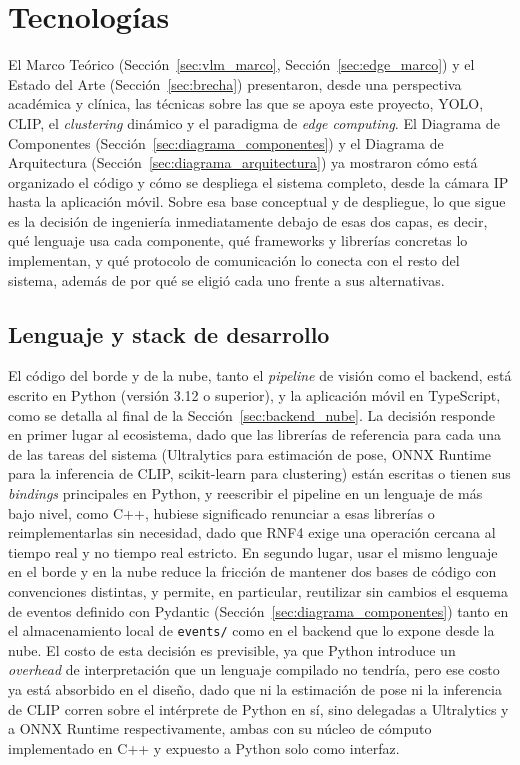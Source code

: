 \section{Tecnologías}
\label{sec:tecnologias}

El Marco Teórico (Sección~\ref{sec:vlm_marco}, Sección~\ref{sec:edge_marco}) y el Estado del Arte (Sección~\ref{sec:brecha}) presentaron, desde una perspectiva académica y clínica, las técnicas sobre las que se apoya este proyecto, YOLO, CLIP, el \textit{clustering} dinámico y el paradigma de \textit{edge computing}.
El Diagrama de Componentes (Sección~\ref{sec:diagrama_componentes}) y el Diagrama de Arquitectura (Sección~\ref{sec:diagrama_arquitectura}) ya mostraron cómo está organizado el código y cómo se despliega el sistema completo, desde la cámara IP hasta la aplicación móvil.
Sobre esa base conceptual y de despliegue, lo que sigue es la decisión de ingeniería inmediatamente debajo de esas dos capas, es decir, qué lenguaje usa cada componente, qué frameworks y librerías concretas lo implementan, y qué protocolo de comunicación lo conecta con el resto del sistema, además de por qué se eligió cada uno frente a sus alternativas.

\subsection{Lenguaje y stack de desarrollo}

El código del borde y de la nube, tanto el \textit{pipeline} de visión como el backend, está escrito en Python (versión 3.12 o superior), y la aplicación móvil en TypeScript, como se detalla al final de la Sección~\ref{sec:backend_nube}.
La decisión responde en primer lugar al ecosistema, dado que las librerías de referencia para cada una de las tareas del sistema (Ultralytics para estimación de pose, ONNX Runtime para la inferencia de CLIP, scikit-learn para clustering) están escritas o tienen sus \textit{bindings} principales en Python, y reescribir el pipeline en un lenguaje de más bajo nivel, como C++, hubiese significado renunciar a esas librerías o reimplementarlas sin necesidad, dado que RNF4 exige una operación cercana al tiempo real y no tiempo real estricto.
En segundo lugar, usar el mismo lenguaje en el borde y en la nube reduce la fricción de mantener dos bases de código con convenciones distintas, y permite, en particular, reutilizar sin cambios el esquema de eventos definido con Pydantic (Sección~\ref{sec:diagrama_componentes}) tanto en el almacenamiento local de \texttt{events/} como en el backend que lo expone desde la nube.
El costo de esta decisión es previsible, ya que Python introduce un \textit{overhead} de interpretación que un lenguaje compilado no tendría, pero ese costo ya está absorbido en el diseño, dado que ni la estimación de pose ni la inferencia de CLIP corren sobre el intérprete de Python en sí, sino delegadas a Ultralytics y a ONNX Runtime respectivamente, ambas con su núcleo de cómputo implementado en C++ y expuesto a Python solo como interfaz.

